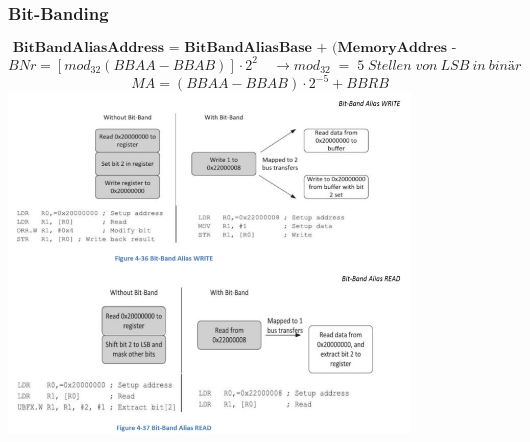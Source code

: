 \subsubsection{Bit-Banding}
\vspace{-0.5cm}
\[\textbf{ BitBandAliasAddress = BitBandAliasBase + (MemoryAddres - BitbandRegionBase)* 32 + 4*BitNumber} \]
\[ BNr=[mod_{32}(BBAA-BBAB)]\cdot 2^2 \quad \rightarrow mod_{32}\; =\; 5\; Stellen\; von\: LSB\: in\: binär \]
\[ MA = (BBAA-BBAB)\cdot 2^{-5} +BBRB \]
\includegraphics[width=0.8\textwidth]{images/bitbanding}